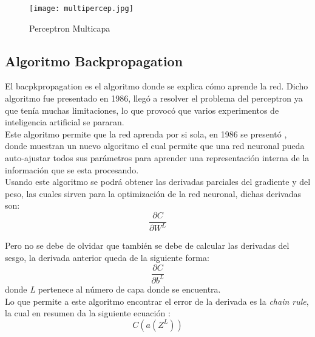             \begin{figure}[H]
                \centering
                \texttt{[image: multipercep.jpg]}
                \caption{Perceptron Multicapa}
                \label{fig:fig8}
            \end{figure}

            
        \subsection{Algoritmo Backpropagation}
        	
        	
        	El bacpkpropagation es el algoritmo donde se explica c\'omo aprende la red.
            Dicho algoritmo fue presentado en 1986, lleg\'o a resolver el problema del perceptron 
            ya que ten\'ia muchas limitaciones, lo que provoc\'o que varios experimentos de inteligencia
            artificial se pararan.\\

            Este algoritmo permite que la red aprenda por si sola, en 1986 se present\'o \cite{rumelhart1986}, 
            donde muestran un nuevo algoritmo el cual permite que una red neuronal pueda auto-ajustar todos sus 
            parámetros para aprender una representaci\'on interna de la informaci\'on que se esta procesando.\\

            Usando este algoritmo se podrá obtener las derivadas parciales del gradiente y del peso, las cuales
            sirven para la optimizaci\'on de la red neuronal, dichas derivadas son:
            \begin{equation*}
                \frac{\partial C}{\partial W^L}
            \end{equation*}
            
            Pero no se debe de olvidar que también se debe de calcular las derivadas del sesgo, la derivada anterior
            queda de la siguiente forma:
            \begin{equation*}
                \frac{\partial C}{\partial b^L}
            \end{equation*}
            donde \textit{L} pertenece al n\'umero de capa donde se encuentra. \\
            
            Lo que permite a este algoritmo encontrar el error de la derivada es la \textit{chain rule}, la cual en resumen 
            da la siguiente ecuaci\'on :
            \begin{equation*}
                C(a(Z^L))
            \end{equation*}

